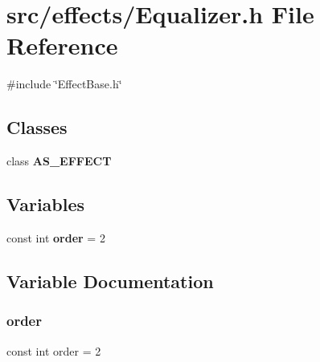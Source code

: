 \section{src/effects/\+Equalizer.h File Reference}
\label{_equalizer_8h}
{\ttfamily \#include \char`\"{}Effect\+Base.\+h\char`\"{}}\newline
\subsection*{Classes}
\begin{DoxyCompactItemize}
\item 
class \textbf{ A\+S\+\_\+\+E\+F\+F\+E\+CT}
\end{DoxyCompactItemize}
\subsection*{Variables}
\begin{DoxyCompactItemize}
\item 
const int \textbf{ order} = 2
\end{DoxyCompactItemize}


\subsection{Variable Documentation}
\mbox{\label{_equalizer_8h_a1b7ba51c7dba40b32bb78cc0fd8074ca}} 
\subsubsection{order}
{\footnotesize\ttfamily const int order = 2}

